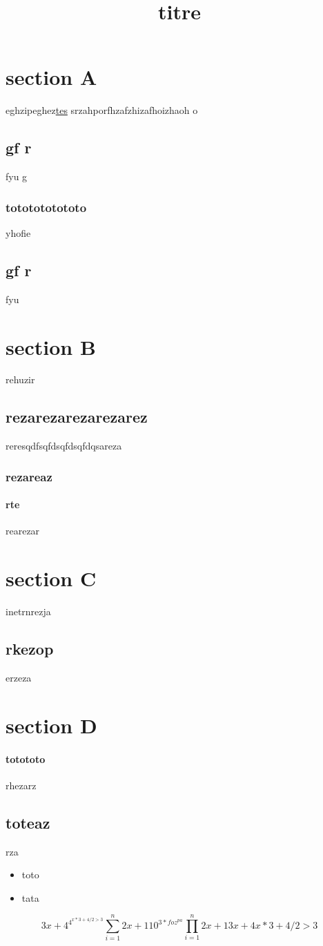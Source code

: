 \documentclass{article}
\title{titre}
\begin{document}
\maketitle
\section{section A}{eghzipeghez\underline{\color{red}tes}
srzahporfhzafzhizafhoizhaoh o\subsection{gf r}{fyu g\subsubsection{tototototototo}{yhofie}
} \subsection{gf r}{fyu}}

\section{section B}{rehuzir\subsection{rezarezarezarezarez}{reresqdfsqfds\color{red}qfdsqfdqsareza\subsubsection{rezareaz}{\paragraph{rte}{rearezar}}}}

\section{section C}{inetrnrezja\subsection{rkezop}{erzeza}}
\section{section D}{\paragraph{totototo}{rhezarz}\subsection{toteaz}{rza}}
\begin{itemize}
	 \item toto
	        \item tata   
      
\end{itemize}
\begin{equation}
3x+4^{4^{x*3+4/2 > 3}}
{\sum_{i=1 }^{n} 2x+1} 
10^{3*foz^{pa}}
{\prod_{i=1 }^{n} 2x+1}
3x+4x*3+4/2 > 3
\end{equation}
\end{document}
